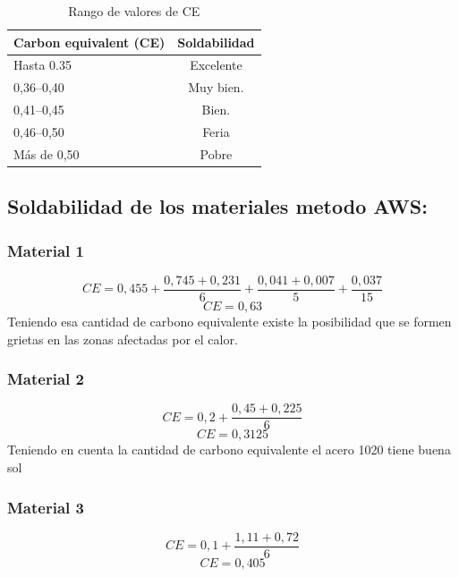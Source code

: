 \documentclass[12pt,a4paper]{article}
\begin{document}
\begin{table}[h]
    \centering
    \caption{Rango de valores de CE}
    \begin{tabular}{l|c}
        \hline
        \textbf{Carbon equivalent (CE)} & \textbf{Soldabilidad} \\ \hline
        Hasta 0.35 & Excelente \\ \hline
        0,36--0,40 & Muy bien. \\ \hline
        0,41--0,45 & Bien. \\ \hline
        0,46--0,50 & Feria \\ \hline
        Más de 0,50 & Pobre \\ \hline
    \end{tabular}
\end{table}


\subsection{Soldabilidad de los materiales metodo AWS:}
\subsubsection{Material 1}
\begin{equation*}
    CE = 0,455 + \frac{0,745 + 0,231}{6} + \frac{0,041 + 0,007}{5} + \frac{0,037}{15}
\end{equation*}
\begin{equation*}
    CE = 0,63
\end{equation*}
Teniendo esa cantidad de carbono equivalente existe la posibilidad que se formen grietas en las zonas afectadas por el calor.

\subsubsection{Material 2}
\begin{equation*}
    CE = 0,2 + \frac{0,45 + 0,225}{6} 
\end{equation*}
\begin{equation*}
    CE = 0,3125
\end{equation*}
Teniendo en cuenta la cantidad de carbono equivalente el acero 1020 tiene buena sol

\subsubsection{Material 3}
\begin{equation*}
    CE = 0,1 + \frac{1,11 + 0,72}{6} 
\end{equation*}
\begin{equation*}
    CE = 0,405
\end{equation*}
\end{document}
